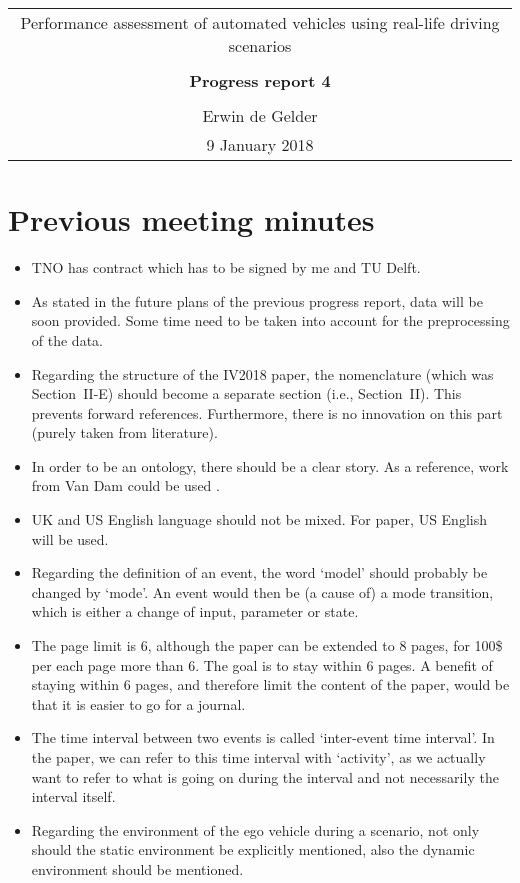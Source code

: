 \documentclass[10pt,final,a4paper,oneside,onecolumn]{article}
\newcommand{\progressreportnumber}{4}
\renewcommand{\author}{Erwin de Gelder}
\renewcommand{\date}{9 January 2018}
\renewcommand{\title}{Performance assessment of automated vehicles using real-life driving scenarios}
\begin{document}
	
\begin{center}
	\begin{tabular}{c}
		\title \\ \\
		\textbf{\huge Progress report \progressreportnumber} \\ \\
		\author \\ 
		\date
	\end{tabular}
\end{center}

\section{Previous meeting minutes}

\begin{itemize}
	\item TNO has contract which has to be signed by me and TU Delft.
	\item As stated in the future plans of the previous progress report, data will be soon provided. Some time need to be taken into account for the preprocessing of the data.
	\item Regarding the structure of the IV2018 paper, the nomenclature (which was Section~II-E) should become a separate section (i.e., Section~II). This prevents forward references. Furthermore, there is no innovation on this part (purely taken from literature).
	\item In order to be an ontology, there should be a clear story. As a reference, work from Van Dam could be used \cite{vanDamPhDThesis2009}.
	\item UK and US English language should not be mixed. For paper, US English will be used.
	\item Regarding the definition of an event, the word `model' should probably be changed by `mode'. An event would then be (a cause of) a mode transition, which is either a change of input, parameter or state. 
	\item The page limit is 6, although the paper can be extended to 8 pages, for 100\$ per each page more than 6. The goal is to stay within 6 pages. A benefit of staying within 6 pages, and therefore limit the content of the paper, would be that it is easier to go for a journal.
	\item The time interval between two events is called `inter-event time interval'. In the paper, we can refer to this time interval with `activity', as we actually want to refer to what is going on during the interval and not necessarily the interval itself.
	\item Regarding the environment of the ego vehicle during a scenario, not only should the static environment be explicitly mentioned, also the dynamic environment should be mentioned. 
\end{itemize}
\end{document}
